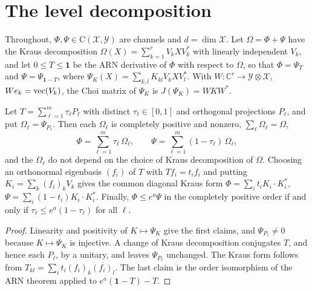 \section{The level decomposition}\label{chn:sec:levels}

Throughout, $\Phi,\Psi\in\mathrm C(\mathcal X,\mathcal Y)$ are channels and $d=\dim\mathcal X$. Let $\Omega=\Phi+\Psi$ have the Kraus decomposition $\Omega(X)=\sum_{k=1}^rV_kXV_k^*$ with linearly independent $V_k$, and let $0\le T\le\mathbf 1$ be the ARN derivative of $\Phi$ with respect to $\Omega$, so that $\Phi=\Psi_T$ and $\Psi=\Psi_{\mathbf 1-T}$, where $\Psi_K(X)=\sum_{k,l}K_{kl}V_kXV_l^*$. With $W:\mathbb C^r\to\mathcal Y\otimes\mathcal X$, $We_k=\operatorname{vec}(V_k)$, the Choi matrix of $\Psi_K$ is $J(\Psi_K)=WKW^*$.

\begin{lemma}\label{chn:lem:levels}
Let $T=\sum_{\ell=1}^m\tau_\ell P_\ell$ with distinct $\tau_\ell\in[0,1]$ and orthogonal projections $P_\ell$, and put $\Omega_\ell=\Psi_{P_\ell}$. Then each $\Omega_\ell$ is completely positive and nonzero, $\sum_\ell\Omega_\ell=\Omega$,
\[
\Phi=\sum_{\ell=1}^m\tau_\ell\,\Omega_\ell,\qquad\Psi=\sum_{\ell=1}^m(1-\tau_\ell)\,\Omega_\ell,
\]
and the $\Omega_\ell$ do not depend on the choice of Kraus decomposition of $\Omega$. Choosing an orthonormal eigenbasis $(f_i)$ of $T$ with $Tf_i=t_if_i$ and putting $K_i=\sum_k(f_i)_kV_k$ gives the common diagonal Kraus form $\Phi=\sum_it_iK_i\cdot K_i^*$, $\Psi=\sum_i(1-t_i)K_i\cdot K_i^*$. Finally, $\Phi\le e^a\Psi$ in the completely positive order if and only if $\tau_\ell\le e^a(1-\tau_\ell)$ for all $\ell$.
\end{lemma}

\begin{proof}
Linearity and positivity of $K\mapsto\Psi_K$ give the first claims, and $\Psi_{P_\ell}\neq0$ because $K\mapsto\Psi_K$ is injective. A change of Kraus decomposition conjugates $T$, and hence each $P_\ell$, by a unitary, and leaves $\Psi_{P_\ell}$ unchanged. The Kraus form follows from $T_{kl}=\sum_it_i(f_i)_k\overline{(f_i)_l}$. The last claim is the order isomorphism of the ARN theorem applied to $e^a(\mathbf 1-T)-T$.
\end{proof}

